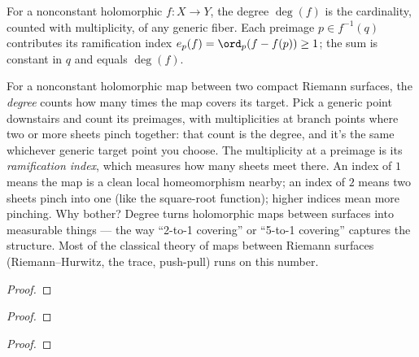 \begin{definition}
\label{def:branched-degree}
For a nonconstant holomorphic \(f:X\to Y\), the degree \(\deg(f)\) is
the cardinality, counted with multiplicity, of any generic fiber. Each
preimage \(p\in f^{-1}(q)\) contributes its ramification index
\(e_p(f)=\ord_p(f - f(p))\ge 1\); the sum is constant in \(q\) and
equals \(\deg(f)\).
\leanok
\end{definition}

\begin{layman}
For a nonconstant holomorphic map between two compact Riemann surfaces,
the \emph{degree} counts how many times the map covers its target.
Pick a generic point downstairs and count its preimages, with
multiplicities at branch points where two or more sheets pinch together:
that count is the degree, and it's the same whichever generic target
point you choose. The multiplicity at a preimage is its
\emph{ramification index}, which measures how many sheets meet there. An
index of \(1\) means the map is a clean local homeomorphism nearby; an
index of \(2\) means two sheets pinch into one (like the square-root
function); higher indices mean more pinching. Why bother? Degree turns
holomorphic maps between surfaces into measurable things --- the way
``2-to-1 covering'' or ``5-to-1 covering'' captures the structure. Most
of the classical theory of maps between Riemann surfaces (Riemann--Hurwitz,
the trace, push-pull) runs on this number.
\end{layman}


\begin{proof}\leanok\end{proof}


\begin{proof}\leanok\end{proof}


\begin{proof}\leanok\end{proof}

